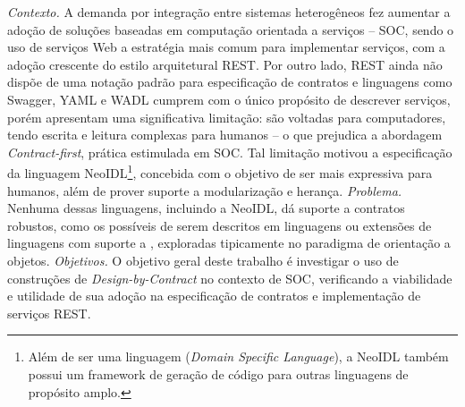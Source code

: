 
\vspace{5mm}

 
\vspace{5mm} 






\emph{Contexto.}
A demanda por integração entre sistemas heterogêneos fez aumentar a adoção de
soluções baseadas em computação orientada a serviços -- SOC, sendo o uso de
serviços Web a estratégia mais comum para implementar serviços, com a adoção crescente do estilo arquitetural REST.
Por outro lado, REST ainda não dispõe de uma notação padrão para especificação
de contratos e linguagens como Swagger, YAML e WADL cumprem com o
único propósito de descrever serviços, porém apresentam uma significativa
limitação: são voltadas para computadores, tendo escrita e leitura complexas para
humanos -- o que prejudica a abordagem \textit{Contract-first}, prática
estimulada em SOC. Tal limitação motivou a especificação da
linguagem NeoIDL\footnote{Além de ser uma linguagem (\textit{Domain Specific
Language}), a NeoIDL também possui um framework de geração de código para outras linguagens de propósito
amplo.}, concebida com o objetivo de ser mais expressiva para humanos,
além de prover suporte a modularização e herança.
\emph{Problema.} Nenhuma dessas linguagens, incluindo a NeoIDL, dá
suporte a contratos robustos, como os possíveis de serem descritos em
linguagens ou extensões de linguagens com suporte a \designbycontract{},
exploradas tipicamente no paradigma de orientação a objetos.
\emph{Objetivos.}
O objetivo geral deste trabalho é investigar o uso de construções de
\textit{Design-by-Contract} no contexto de SOC,
verificando a viabilidade e utilidade de sua adoção na especificação de
contratos e implementação de serviços REST.
%
